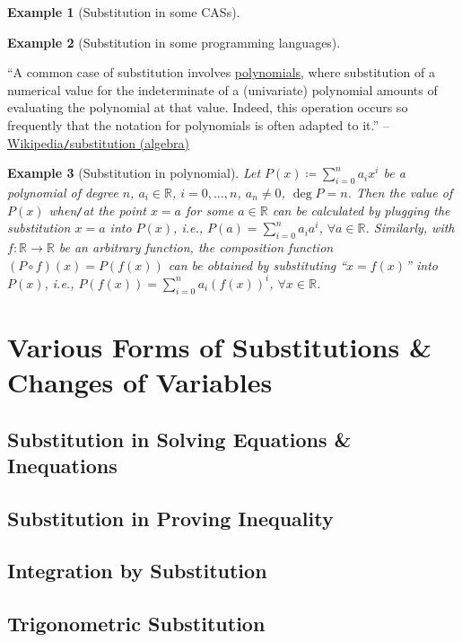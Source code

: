 \documentclass{article}
\numberwithin{equation}{section}
\newtheorem{example}{Example}[section]
\begin{document}
\begin{example}[Substitution in some CASs]
	
\end{example}

\begin{example}[Substitution in some programming languages]
	
\end{example}

``A common case of substitution involves \href{https://en.wikipedia.org/wiki/Polynomial}{polynomials}, where substitution of a numerical value for the indeterminate of a (univariate) polynomial amounts of evaluating the polynomial at that value. Indeed, this operation occurs so frequently that the notation for polynomials is often adapted to it.'' -- \href{https://en.wikipedia.org/wiki/Substitution_(algebra)}{Wikipedia\texttt{/}substitution (algebra)}

\begin{example}[Substitution in polynomial]
	Let $P(x)\coloneqq\sum_{i=0}^n a_ix^i$ be a polynomial of degree $n$, $a_i\in\mathbb{R}$, $i = 0,\ldots,n$, $a_n\ne 0$, $\deg P = n$. Then the value of $P(x)$ when\emph{\texttt{/}}at the point $x = a$ for some $a\in\mathbb{R}$ can be calculated by plugging the substitution $x = a$ into $P(x)$, i.e., $P(a) = \sum_{i=0}^n a_ia^i$, $\forall a\in\mathbb{R}$. Similarly, with $f:\mathbb{R}\to\mathbb{R}$ be an arbitrary function, the composition function $(P\circ f)(x) = P(f(x))$ can be obtained by substituting ``$x = f(x)$'' into $P(x)$, i.e., $P(f(x)) = \sum_{i=0}^n a_i(f(x))^i$, $\forall x\in\mathbb{R}$.
\end{example}


\section{Various Forms of Substitutions \& Changes of Variables}

\subsection{Substitution in Solving Equations \& Inequations}

\subsection{Substitution in Proving Inequality}

\subsection{Integration by Substitution}

\subsection{Trigonometric Substitution}



\printbibliography[heading=bibintoc]
	
\end{document}
